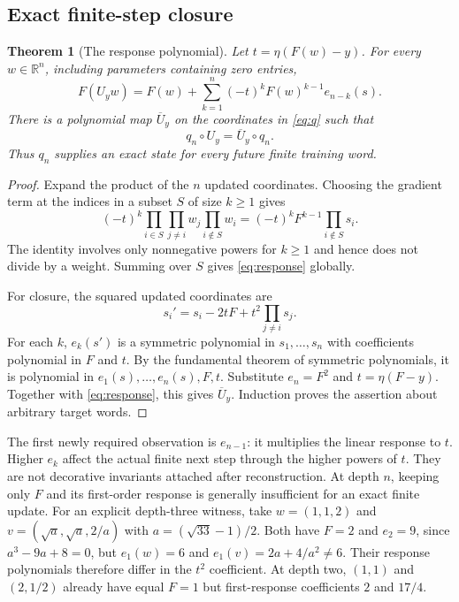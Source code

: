 \documentclass[11pt]{article}
\newtheorem{theorem}{Theorem}[section]
\theoremstyle{definition}\newtheorem{definition}[theorem]{Definition}
\theoremstyle{remark}\newtheorem{remark}[theorem]{Remark}
\newcommand{\R}{\mathbb R}
\begin{document}
\subsection{Exact finite-step closure}
\begin{theorem}[The response polynomial]\label{thm:response}
Let $t=\eta(F(w)-y)$. For every $w\in\R^n$, including parameters containing zero entries,
\begin{equation}\label{eq:response}
 F(U_yw)=F(w)+\sum_{k=1}^n(-t)^k F(w)^{k-1}e_{n-k}(s).
\end{equation}
There is a polynomial map $\overline U_y$ on the coordinates in \eqref{eq:q} such that
\[
 q_n\circ U_y=\overline U_y\circ q_n.
\]
Thus $q_n$ supplies an exact state for every future finite training word.
\end{theorem}
\begin{proof}
Expand the product of the $n$ updated coordinates. Choosing the gradient term at the indices in a subset $S$ of size $k\ge1$ gives
\[
 (-t)^k\prod_{i\in S}\prod_{j\ne i}w_j\prod_{i\notin S}w_i
 =(-t)^kF^{k-1}\prod_{i\notin S}s_i.
\]
The identity involves only nonnegative powers for $k\ge1$ and hence does not divide by a weight. Summing over $S$ gives \eqref{eq:response} globally.

For closure, the squared updated coordinates are
\[
 s_i'=s_i-2tF+t^2\prod_{j\ne i}s_j.
\]
For each $k$, $e_k(s')$ is a symmetric polynomial in $s_1,\ldots,s_n$ with coefficients polynomial in $F$ and $t$. By the fundamental theorem of symmetric polynomials, it is polynomial in $e_1(s),\ldots,e_n(s),F,t$. Substitute $e_n=F^2$ and $t=\eta(F-y)$. Together with \eqref{eq:response}, this gives $\overline U_y$. Induction proves the assertion about arbitrary target words.
\end{proof}

The first newly required observation is $e_{n-1}$: it multiplies the linear response to $t$. Higher $e_k$ affect the actual finite next step through the higher powers of $t$. They are not decorative invariants attached after reconstruction. At depth $n$, keeping only $F$ and its first-order response is generally insufficient for an exact finite update. For an explicit depth-three witness, take $w=(1,1,2)$ and $v=(\sqrt a,\sqrt a,2/a)$ with $a=(\sqrt{33}-1)/2$. Both have $F=2$ and $e_2=9$, since $a^3-9a+8=0$, but $e_1(w)=6$ and $e_1(v)=2a+4/a^2\ne6$. Their response polynomials therefore differ in the $t^2$ coefficient. At depth two, $(1,1)$ and $(2,1/2)$ already have equal $F=1$ but first-response coefficients $2$ and $17/4$.
\end{document}
